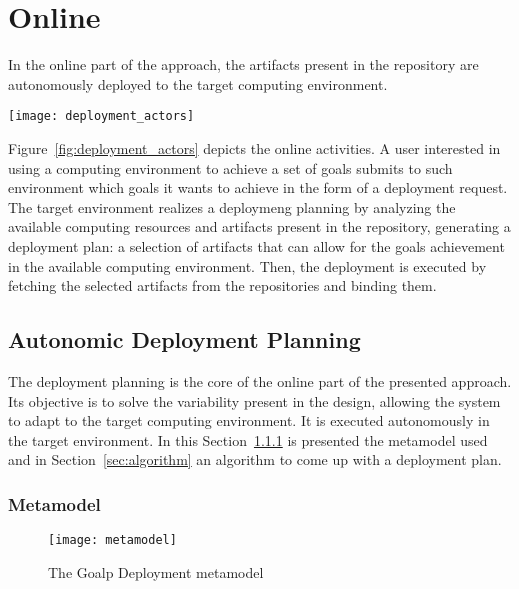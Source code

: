 \section{Online}
\label{sec:online}

In the online part of the approach, the artifacts present in the repository are autonomously deployed to the target computing environment.

\begin{figure*}[!htb]
  \centering
  \texttt{[image: deployment\_actors]}
  \caption{Goald Autonomic Deployment}
\label{fig:deployment_actors}
\end{figure*}

Figure~\ref{fig:deployment_actors} depicts the online activities. A user interested in using a computing environment to achieve a set of goals submits to such environment which goals it wants to achieve in the form of a deployment request.
The target environment  realizes a deploymeng planning by analyzing the available computing resources and artifacts present in the repository,
generating a deployment plan:  a selection of artifacts that can allow for the goals achievement in the available computing environment. Then, the deployment is executed by fetching the selected artifacts from the repositories and binding them.

\subsection{Autonomic Deployment Planning}
\label{sec:planning}

The deployment planning is the core of the online part of the presented approach. Its objective is to solve the variability present in the design, allowing the system to adapt to the target computing environment. It is executed autonomously in the target environment. In this Section~\ref{sec:metamodel} is presented the metamodel used and in Section~\ref{sec:algorithm} an algorithm to come up with a deployment plan.

\subsubsection{Metamodel}
\label{sec:metamodel}

\begin{figure}[!htb]
  \centering
  \texttt{[image: metamodel]}
  \caption{The Goalp Deployment metamodel}
  \label{fig:metamodel}
\end{figure}

